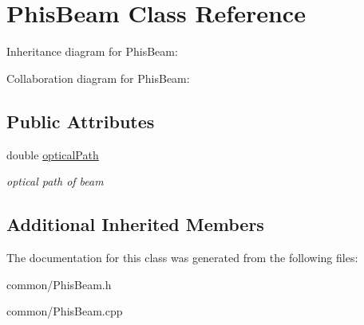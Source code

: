 \hypertarget{class_phis_beam}{}\section{Phis\+Beam Class Reference}
\label{class_phis_beam}


Inheritance diagram for Phis\+Beam\+:


Collaboration diagram for Phis\+Beam\+:
\subsection*{Public Attributes}
\begin{DoxyCompactItemize}
\item 
\mbox{\label{class_phis_beam_a31d260d43669ed31679cb41f95ca2056}} 
double \mbox{\hyperlink{class_phis_beam_a31d260d43669ed31679cb41f95ca2056}{optical\+Path}}
\begin{DoxyCompactList}\small\item\em optical path of beam \end{DoxyCompactList}\end{DoxyCompactItemize}
\subsection*{Additional Inherited Members}


The documentation for this class was generated from the following files\+:\begin{DoxyCompactItemize}
\item 
common/Phis\+Beam.\+h\item 
common/Phis\+Beam.\+cpp\end{DoxyCompactItemize}
